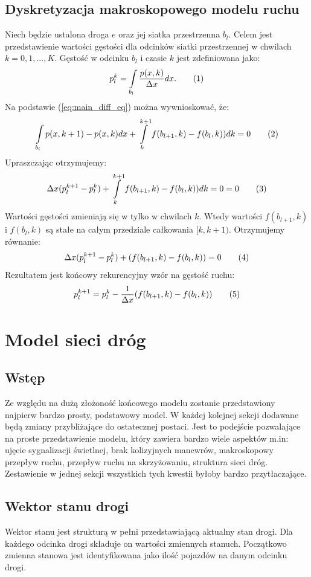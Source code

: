 \documentclass[12pt]{book}
\theoremstyle{plain}
\newcommand\addtag{\refstepcounter{equation}
\renewcommand{\labelenumii}{\theenumii}
\renewcommand{\theenumii}{\theenumi.\arabic{enumii}.}
\tag{\theequation}}
\begin{document}
\section{Dyskretyzacja makroskopowego modelu ruchu}
Niech będzie ustalona droga $e$ oraz jej siatka przestrzenna $b_l$. Celem jest przedstawienie wartości gęstości dla odcinków siatki przestrzennej w chwilach $k=0,1,...,K$.
Gęstość w odcinku $b_l$ i czasie $k$ jest zdefiniowana jako:
\[p_{l}^{k}=\int\limits_{{b_{l}}}{\frac{p(x,k)}{\Delta x}dx}. \addtag\]
Na podstawie (\ref{eq:main_diff_eq}) można wywnioskować, że:
\[\int\limits_{b_{l}} {p(x,k+1)- p(x,k)dx} +\int\limits_{k}^{k+1} f(b_{l+1},k)-f(b_{l},k))dk=0 \addtag \label{eq:calki-LWR} \]
Upraszczając otrzymujemy:
\[\Delta x(p_l^{k+1}-p_l^{k}) +\int\limits_{k}^{k+1} f(b_{l+1},k)-f(b_{l},k))dk=0=0 \addtag \]
Wartości gęstości zmieniają się w tylko w chwilach $k$. Wtedy wartości $f(b_{l+1},k)$ i $f(b_l,k)$ są stałe na całym przedziale całkowania $[k,k+1)$. Otrzymujemy równanie:
\[\Delta x(p_l^{k+1}-p_l^{k})  + (f(b_{l+1},k)-f(b_l,k))=0 \addtag \]
Rezultatem jest końcowy rekurencyjny wzór na gęstość ruchu:
\[p_l^{k+1}=p_l^{k}  -\frac{1}{\Delta x}  (f(b_{l+1},k)-f(b_l,k)) \addtag \]


\chapter{Model sieci dróg}
\section{Wstęp}
Ze względu na dużą złożoność końcowego modelu zostanie przedstawiony najpierw bardzo prosty, podstawowy model. W każdej kolejnej sekcji dodawane będą zmiany przybliżające do ostatecznej postaci. Jest to podejście pozwalające na proste przedstawienie modelu, który zawiera bardzo wiele aspektów m.in:
ujęcie sygnalizacji świetlnej, brak kolizyjnych manewrów, makroskopowy przepływ ruchu, przepływ ruchu na skrzyżowaniu, struktura sieci dróg. Zestawienie w jednej sekcji wszystkich tych kwestii byłoby bardzo przytłaczające.

\section{Wektor stanu drogi} \label{sec:wektor_stanu_drogi}
Wektor stanu jest strukturą w pełni przedstawiającą aktualny stan drogi. Dla każdego odcinka drogi składuje on wartości zmiennych stanuch. Początkowo zmienna stanowa jest identyfikowana jako ilość pojazdów na danym odcinku drogi. 
\end{document}
